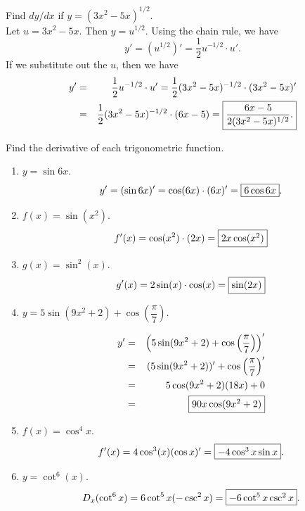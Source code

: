 \documentclass{book}
\begin{document}
\begin{Exam} Find $dy/dx$ if $y = (3x^2-5x)^{1/2}$.\\

Let $u = 3x^2-5x$. Then $y = u^{1/2}$. Using the chain rule, we have 
\[y' = (u^{1/2})' = \frac{1}{2}u^{-1/2}\cdot u'.\] If we substitute out the $u$, then we have 
\begin{eqnarray*}
y' &=& \frac{1}{2}u^{-1/2}\cdot u'  = \frac{1}{2}(3x^2-5x)^{-1/2}\cdot(3x^2-5x)' \\
&=& \frac{1}{2}(3x^2-5x)^{-1/2}\cdot(6x-5) = \fbox{$\dfrac{6x-5}{2(3x^2-5x)^{1/2}}.$}
\end{eqnarray*}
\end{Exam}\vs

\begin{Exam} Find the derivative of each trigonometric function.
\begin{enumerate}
\item $y = \sin 6x$.
\[y' = (\sin 6x)' = \cos(6x)\cdot(6x)' = \fbox{$6\cos 6x$}.\]\vs

\item $f(x)= \sin (x^2)$.
\[f'(x) = \cos(x^2)\cdot (2x) = \fbox{$2x\cos(x^2)$}\]\vs

\item $g(x) = \sin^2(x)$.
\[g'(x) = 2\sin(x)\cdot\cos(x) = \fbox{$\sin(2x)$}\]\vs

\item $y = 5\sin(9x^2+2) + \cos\left(\dfrac{\pi}{7}\right)$.

\begin{eqnarray*}
y' &=& \left(5\sin(9x^2+2) + \cos\left(\dfrac{\pi}{7}\right)\right)'\\
&=& (5\sin(9x^2+2))' + \cos\left(\dfrac{\pi}{7}\right)'\\
&=& 5\cos(9x^2+2)(18x) + 0\\
&=& \fbox{$90x\cos(9x^2+2)$}
\end{eqnarray*}\vs

\item $f(x) = \cos^4 x$.
\[f'(x) = 4\cos^3(x)(\cos x)' = \fbox{$-4 \cos^3 x \sin x$}.\]\vs

\item $y = \cot^6(x)$.
\[D_x(\cot^6 x) = 6\cot^5x(-\csc^2 x) = \fbox{$- 6\cot^5x\csc^2x$}. \]
\end{enumerate}
\end{Exam}\vs
\end{document}
